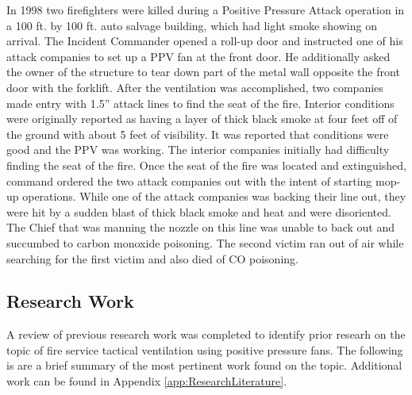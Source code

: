 \documentclass{article}
\begin{document}
In 1998 two firefighters were killed during a Positive Pressure Attack operation in a 100 ft. by 100 ft. auto salvage building, which had light smoke showing on arrival. The Incident Commander opened a roll-up door and instructed one of his attack companies to set up a PPV fan at the front door. He additionally asked the owner of the structure to tear down part of the metal wall opposite the front door with the forklift. After the ventilation was accomplished, two companies made entry with 1.5” attack lines to find the seat of the fire. Interior conditions were originally reported as having a layer of thick black smoke at four feet off of the ground with about 5 feet of visibility. It was reported that conditions were good and the PPV was working. The interior companies initially had difficulty finding the seat of the fire. Once the seat of the fire was located and extinguished, command ordered the two attack companies out with the intent of starting mop-up operations. While one of the attack companies was backing their line out, they were hit by a sudden blast of thick black smoke and heat and were disoriented. The Chief that was manning the nozzle on this line was unable to back out and succumbed to carbon monoxide poisoning. The second victim ran out of air while searching for the first victim and also died of CO poisoning.\cite{NIOSHF1998_32}

\subsection{Research Work}
A review of previous research work was completed to identify prior researh on the topic of fire service tactical ventilation using positive pressure fans. The following is are a brief summary of the most pertinent work found on the topic. Additional work can be found in Appendix \ref{app:ResearchLiterature}.

\end{document}
